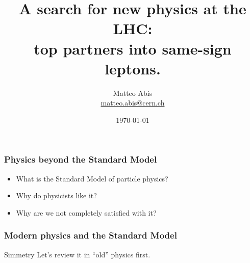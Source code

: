 \documentclass[ukenglish]{beamer}
\title[Top Partners at the LHC]{A search for new physics at the LHC:\\
top partners into same-sign leptons.}
\author{Matteo Abis\\
\url{matteo.abis@cern.ch}}
\institute{Università di Padova and CERN}
\date{\today}
\begin{document}
\begin{frame}
  \titlepage
\end{frame}
 
\begin{frame}
    \frametitle{Physics beyond the Standard Model}
    \begin{itemize}
        \item What is the Standard Model of particle physics?
        \item Why do physicists like it?
        \item Why are we not completely satisfied with it?
    \end{itemize}
\end{frame}

\begin{frame}
    \frametitle{Modern physics and the Standard Model}
    \begin{block}
        {Simmetry}
        Let's review it in ``old'' physics first.
    \end{block}
\end{frame}
\end{document}
